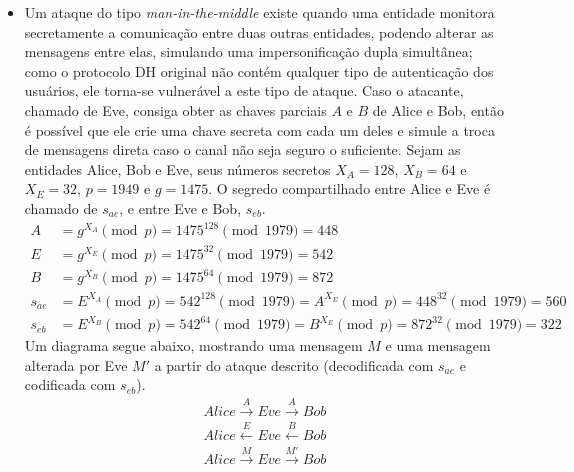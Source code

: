 \documentclass{../sftex/sftex}
\begin{document}
\begin{itemize}
O tamanho de $\approx 80$ bits obtido para os números primos aleatórios acontece
pois a extração de raízes primitivas é um processo custoso; depois de
otimizações no cálculo da função totiente de Euler e da utilização de uma
implementação alternativa da linguagem
Python\footnote{\href{http://pypy.org/}{PyPy} --- o principal recurso
apresentado é a utilização de um compilador JIT (\emph{just-in-time}).},
percebeu-se que uma abordagem diferente seria necessária para que tal processo
fosse acelerado, como uma mudança de linguagem de programação, e assim todo o
ecossistema já construído para o trabalho precisaria ser refeito. Portanto, a
prova de conceito é demonstrada com números de tamanho reduzido.

\item Um ataque do tipo \emph{man-in-the-middle} existe quando uma entidade
monitora secretamente a comunicação entre duas outras entidades, podendo alterar
as mensagens entre elas, simulando uma impersonificação dupla simultânea; como o
protocolo DH original não contém qualquer tipo de autenticação dos usuários, ele
torna-se vulnerável a este tipo de ataque. Caso o atacante, chamado de Eve,
consiga obter as chaves parciais $A$ e $B$ de Alice e Bob, então é possível que
ele crie uma chave secreta com cada um deles e simule a troca de mensagens
direta caso o canal não seja seguro o suficiente. Sejam as entidades Alice, Bob
e Eve, seus números secretos $X_A = 128$, $X_B = 64$ e $X_E = 32$, $p = 1949$ e
$g = 1475$. O segredo compartilhado entre Alice e Eve é chamado de $s_{ae}$, e
entre Eve e Bob, $s_{eb}$.
\begin{align*}
A &= g^{X_A} \pmod{p} = 1475^{128} \pmod{1979} = 448 \\
E &= g^{X_E} \pmod{p} = 1475^{32} \pmod{1979} = 542 \\
B &= g^{X_B} \pmod{p} = 1475^{64} \pmod{1979} = 872 \\
s_{ae} &= E^{X_A} \pmod{p} = 542^{128} \pmod{1979}
        = A^{X_E} \pmod{p} = 448^{32} \pmod{1979} = 560 \\
s_{eb} &= E^{X_B} \pmod{p} = 542^{64} \pmod{1979}
        = B^{X_E} \pmod{p} = 872^{32} \pmod{1979} = 322
\end{align*}
Um diagrama segue abaixo, mostrando uma mensagem $M$ e uma mensagem alterada por
Eve $M'$ a partir do ataque descrito (decodificada com $s_{ae}$ e codificada com
$s_{eb}$).
\begin{align*}
Alice \overset{A}{\longrightarrow} Eve \overset{A}{\longrightarrow} Bob \\
Alice \overset{E}{\longleftarrow} Eve \overset{B}{\longleftarrow} Bob \\
Alice \overset{M}{\longrightarrow} Eve \overset{M'}{\longrightarrow} Bob
\end{align*}


\end{itemize}
\end{document}
